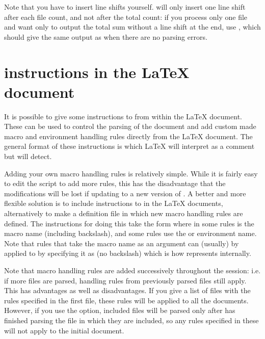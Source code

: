 \documentclass{article}
\begin{document}
Note that you have to insert line shifts yourself. \TeXcount{} will only insert one line shift after each file count, and not after the total count: if you process only one file and want only to output the total sum without a line shift at the end, use , which should give the same output as  when there are no parsing errors.




\section{\TeXcount{} instructions in the \LaTeX{} document}

It is possible to give some instructions to \TeXcount{} from within the
\LaTeX{} document. These can be used to control the parsing of the document and add custom made macro and environment handling rules directly from the \LaTeX{} document. The general format of these instructions is
which \LaTeX{} will interpret as a comment but \TeXcount{} will detect.

Adding your own macro handling rules is relatively simple. While it is fairly easy to edit the script to add more rules, this has the disadvantage that the modifications will be lost if updating to a new version of \TeXcount. A better and more flexible solution is to include instructions to \TeXcount{} in the \LaTeX{} documents, alternatively to make a definition file in which new macro handling rules are defined. The \TeXcount{} instructions for doing this take the form
where in some rules  is the macro name (including backslash), and some rules use the or environment name. Note that rules that take the macro name as an argument can (usually) by applied to  by specifying it as  (no backslash) which is how \TeXcount{} represents  internally.
%


Note that macro handling rules are added successively throughout the session: i.e. if more files are parsed, handling rules from previously parsed files still apply. This has advantages as well as disadvantages. If you give a list of files with the rules specified in the first file, these rules will be applied to all the documents. However, if you use the  option, included files will be parsed only after \TeXcount{} has finished parsing the file in which they are included, so any rules specified in these will not apply to the initial document.
\end{document}
